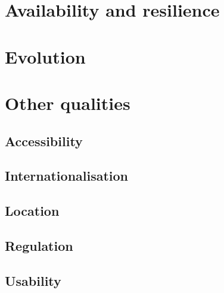 \section{Availability and resilience}
\label{sec:avail-resil}



\section{Evolution}
\label{sec:evolution}


\section{Other qualities}
\label{sec:other-qualities}

\subsection{Accessibility}
\label{sec:accessibility}


\subsection{Internationalisation}
\label{sec:internationalisation}


\subsection{Location}
\label{sec:location}


\subsection{Regulation}
\label{sec:regulation}


\subsection{Usability}
\label{sec:usability}


